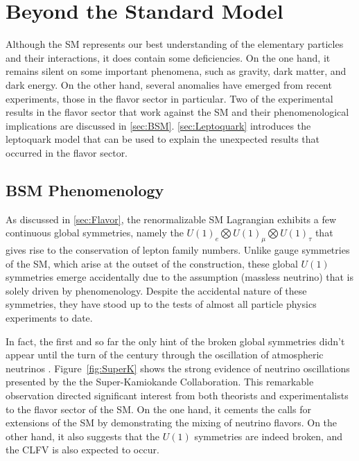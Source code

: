 \chapter{Beyond the Standard Model}
\label{chap:BSM}

Although the \ac{SM} represents our best understanding of the elementary particles and their interactions, it does contain some deficiencies. On the one hand, it remains silent on some important phenomena, such as gravity, dark matter, and dark energy. On the other hand, several anomalies have emerged from recent experiments, those in the flavor sector in particular. Two of the experimental results in the flavor sector that work against the \ac{SM} and their phenomenological implications are discussed in \autoref{sec:BSM}. \autoref{sec:Leptoquark} introduces the leptoquark model that can be used to explain the unexpected results that occurred in the flavor sector.

\section{BSM Phenomenology}
\label{sec:BSM}

As discussed in \autoref{sec:Flavor}, the renormalizable \ac{SM} Lagrangian exhibits a few continuous global symmetries, namely the $U(1)_{e}\bigotimes U(1)_{\mu}\bigotimes U(1)_{\tau}$ that gives rise to the conservation of lepton family numbers. Unlike gauge symmetries of the \ac{SM}, which arise at the outset of the construction, these global $U(1)$ symmetries emerge accidentally due to the assumption (massless neutrino) that is solely driven by phenomenology. Despite the accidental nature of these symmetries, they have stood up to the tests of almost all particle physics experiments to date.  

In fact, the first and so far the only hint of the broken global symmetries didn't appear until the turn of the century through the oscillation of atmospheric neutrinos \cite{Super-Kamiokande:1998kpq,SNO:2002tuh}. Figure~\ref{fig:SuperK} shows the strong evidence of neutrino oscillations presented by the the Super-Kamiokande Collaboration. This remarkable observation directed significant interest from both theorists and experimentalists to the flavor sector of the \ac{SM}. On the one hand, it cements the calls for extensions of the \ac{SM} by demonstrating the mixing of neutrino flavors. On the other hand, it also suggests that the $U(1)$ symmetries are indeed broken, and the \ac{CLFV} is also expected to occur. 

